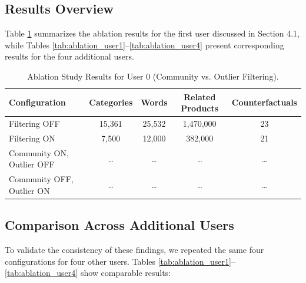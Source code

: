 \subsection{Results Overview}
Table \ref{tab:ablation_user0} summarizes the ablation results for the first
user discussed in Section 4.1, while Tables \ref{tab:ablation_user1}–\ref{tab:ablation_user4}
present corresponding results for the four additional users.


\begin{table}[htbp]
    \centering
    \caption{Ablation Study Results for User 0 (Community vs. Outlier Filtering).}
    \label{tab:ablation_user0}
    \begin{tabular}{lcccc}
        \hline
        Configuration    & Categories & Words  & Related Products & Counterfactuals \\
        \hline
        Filtering OFF    & 15,361     & 25,532 & 1,470,000       & 23              \\
        Filtering ON     & 7,500      & 12,000 & 382,000         & 21              \\
        Community ON, Outlier OFF & \dots & \dots & \dots & \dots \\
        Community OFF, Outlier ON & \dots & \dots & \dots & \dots \\
        \hline
    \end{tabular}
\end{table}


\subsection{Comparison Across Additional Users}

To validate the consistency of these findings, we repeated the same four
configurations for four other users. Tables \ref{tab:ablation_user1}–\ref{tab:ablation_user4}
show comparable results:


\begin{table}[htbp]
    \centering
    \caption{Results for User 1}
    \label{tab:ablation_user1}
\end{table}

